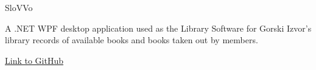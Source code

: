 \begin{cventries}
  \cventry
    {SloVVo} %
    {} %
    {} %
    {} %
    { %
      \begin{cvitems} 
        \item {A .NET WPF desktop application used as the Library Software for Gorski Izvor's library records of available books and books taken out by members.}
        \item {\href{https://github.com/art3xias23/SloVVo}{Link to GitHub}}
      \end{cvitems}
    }

\end{cventries}
